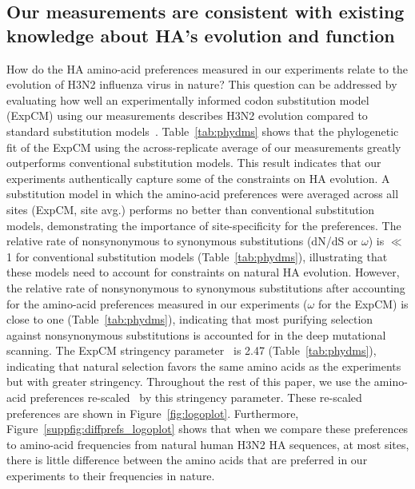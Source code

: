 \documentclass[9pt,twocolumn,twoside]{pnas-new}
\begin{document}
\subsection*{Our measurements are consistent with existing knowledge about HA's evolution and function}
How do the HA amino-acid preferences measured in our experiments relate to the evolution of H3N2 influenza virus in nature?
This question can be addressed by evaluating how well an experimentally informed codon substitution model (ExpCM) using our measurements describes H3N2 evolution compared to standard substitution models~\cite{bloom2017identification,hilton2017phydms}.
Table~\ref{tab:phydms} shows that the phylogenetic fit of the ExpCM using the across-replicate average of our measurements greatly outperforms conventional substitution models.
This result indicates that our experiments authentically capture some of the constraints on HA evolution.
A substitution model in which the amino-acid preferences were averaged across all sites (ExpCM, site avg.) performs no better than conventional substitution models, demonstrating the importance of site-specificity for the preferences.
The relative rate of nonsynonymous to synonymous substitutions (dN/dS or $\omega$) is $\ll$1 for conventional substitution models (Table~\ref{tab:phydms}), illustrating that these models need to account for constraints on natural HA evolution.
However, the relative rate of nonsynonymous to synonymous substitutions after accounting for the amino-acid preferences measured in our experiments ($\omega$ for the ExpCM) is close to one (Table~\ref{tab:phydms}), indicating that most purifying selection against nonsynonymous substitutions is accounted for in the deep mutational scanning.
The ExpCM stringency parameter~\cite{hilton2017phydms} is 2.47 (Table~\ref{tab:phydms}), indicating that natural selection favors the same amino acids as the experiments but with greater stringency.
Throughout the rest of this paper, we use the amino-acid preferences re-scaled~\cite{bloom2017identification,hilton2017phydms} by this stringency parameter.
These re-scaled preferences are shown in Figure~\ref{fig:logoplot}.
Furthermore, Figure~\ref{suppfig:diffprefs_logoplot} shows that when we compare these preferences to amino-acid frequencies from natural human H3N2 HA sequences, at most sites, there is little difference between the amino acids that are preferred in our experiments to their frequencies in nature.
\end{document}
